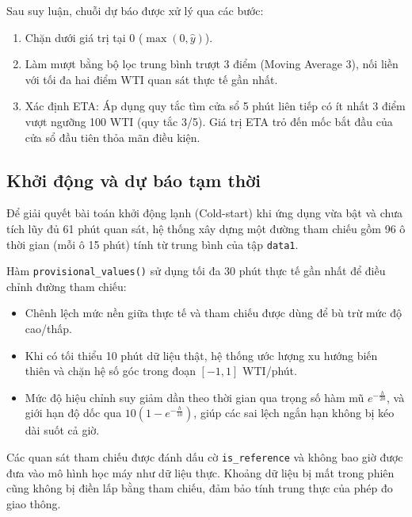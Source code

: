     Sau suy luận, chuỗi dự báo được xử lý qua các bước:
    \begin{enumerate}
        \item Chặn dưới giá trị tại 0 ($\max(0, \hat{y})$).
        \item Làm mượt bằng bộ lọc trung bình trượt 3 điểm (Moving Average 3), nối liền với tối đa hai điểm WTI quan sát thực tế gần nhất.
        \item Xác định ETA: Áp dụng quy tắc tìm cửa sổ 5 phút liên tiếp có ít nhất 3 điểm vượt ngưỡng 100 WTI (quy tắc 3/5). Giá trị ETA trỏ đến mốc bắt đầu của cửa sổ đầu tiên thỏa mãn điều kiện.
    \end{enumerate}

    

    \subsection{Khởi động và dự báo tạm thời}
    Để giải quyết bài toán khởi động lạnh (Cold-start) khi ứng dụng vừa bật và chưa tích lũy đủ 61 phút quan sát, hệ thống xây dựng một đường tham chiếu gồm 96 ô thời gian (mỗi ô 15 phút) tính từ trung bình của tập \texttt{data1}.

    Hàm \texttt{provisional\_values()} sử dụng tối đa 30 phút thực tế gần nhất để điều chỉnh đường tham chiếu:
   \begin{itemize}
        \item Chênh lệch mức nền giữa thực tế và tham chiếu được dùng để bù trừ mức độ cao/thấp.
        \item Khi có tối thiểu 10 phút dữ liệu thật, hệ thống ước lượng xu hướng biến thiên và chặn hệ số góc trong đoạn $[-1, 1]$ WTI/phút.
        \item Mức độ hiệu chỉnh suy giảm dần theo thời gian qua trọng số hàm mũ $e^{-\frac{h}{20}}$, và giới hạn độ dốc qua $10 \left(1 - e^{-\frac{h}{10}}\right)$, giúp các sai lệch ngắn hạn không bị kéo dài suốt cả giờ.
    \end{itemize}

    Các quan sát tham chiếu được đánh dấu cờ \texttt{is\_reference} và không bao giờ được đưa vào mô hình học máy như dữ liệu thực. Khoảng dữ liệu bị mất trong phiên cũng không bị điền lấp bằng tham chiếu, đảm bảo tính trung thực của phép đo giao thông.

